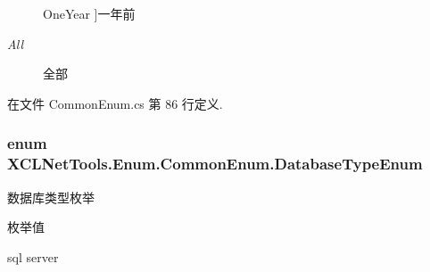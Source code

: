 \begin{Desc}
\begin{description}
{\hypertarget{class_x_c_l_net_tools_1_1_enum_1_1_common_enum_abac0e863746b7fb8e6364c17f61648eaae0e2407272c8d5ee6e131146067c7055}{One\-Year}\label{class_x_c_l_net_tools_1_1_enum_1_1_common_enum_abac0e863746b7fb8e6364c17f61648eaae0e2407272c8d5ee6e131146067c7055}
}]一年前 \item[{\em 
\hypertarget{class_x_c_l_net_tools_1_1_enum_1_1_common_enum_abac0e863746b7fb8e6364c17f61648eaab1c94ca2fbc3e78fc30069c8d0f01680}{All}\label{class_x_c_l_net_tools_1_1_enum_1_1_common_enum_abac0e863746b7fb8e6364c17f61648eaab1c94ca2fbc3e78fc30069c8d0f01680}
}]全部 \end{description}
\end{Desc}


在文件 Common\-Enum.\-cs 第 86 行定义.

\hypertarget{class_x_c_l_net_tools_1_1_enum_1_1_common_enum_a4c4edc085935542b75e6386cb261ab4b}{
\subsubsection[{Database\-Type\-Enum}]{\setlength{\rightskip}{0pt plus 5cm}enum {\bf X\-C\-L\-Net\-Tools.\-Enum.\-Common\-Enum.\-Database\-Type\-Enum}}}\label{class_x_c_l_net_tools_1_1_enum_1_1_common_enum_a4c4edc085935542b75e6386cb261ab4b}


数据库类型枚举 

\begin{Desc}
\item[枚举值]\par
\begin{description}
\item[{\em 
\hypertarget{class_x_c_l_net_tools_1_1_enum_1_1_common_enum_a4c4edc085935542b75e6386cb261ab4ba1d37e2cfa8532be01d3f89c76ccfe4a9}{M\-S\-S\-Q\-L}\label{class_x_c_l_net_tools_1_1_enum_1_1_common_enum_a4c4edc085935542b75e6386cb261ab4ba1d37e2cfa8532be01d3f89c76ccfe4a9}
}]sql server \end{description}
\end{Desc}


